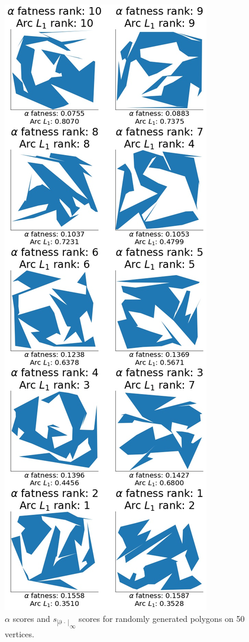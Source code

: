 \documentclass[]{jocg}
\newcommand{\abs}[1]{|#1|}
\newcommand{\chordarc}{s_{\abs{\partial~\cdot~}}}
\theoremstyle{definition}
\theoremstyle{remark}
\begin{document}
\begin{figure}[t]
  \centering
  \includegraphics[height=0.8\textheight]{../plots/u_50_alpha_score_chord_arc_one_vertices_0-05_delta_ranking.jpg}
  \caption{$\alpha$ scores and ${\chordarc}_{\infty}$ scores for randomly
  generated polygons on 50 vertices.}
  \label{fig:alph-inft-10}
\end{figure}
\end{document}
